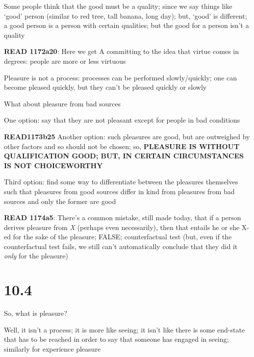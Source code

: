\documentclass[11pt]{article}
\begin{document}
\noindent Some people think that the good must be a quality; since we say things like `good' person (similar to red tree, tall banana, long day); but, `good' is different; a good person is a person with certain qualities; but the good for a person isn't a quality
\vspace*{2mm}

\noindent \textbf{READ 1172a20}: Here we get A committing to the idea that virtue comes in degrees: people are more or less virtuous
\vspace*{2mm}

\noindent Pleasure is not a process: processes can be performed slowly/quickly; one can become pleased quickly, but they can't be pleased quickly or slowly
\vspace*{2mm}

\noindent What about pleasure from bad sources
\vspace*{2mm}

\noindent One option: say that they are not pleasant except for people in bad conditions
\vspace*{2mm}

\noindent \textbf{READ1173b25} Another option: such pleasures are good, but are outweighed by other factors and so should not be chosen; so, \textbf{PLEASURE IS WITHOUT QUALIFICATION GOOD; BUT, IN CERTAIN CIRCUMSTANCES IS NOT CHOICEWORTHY}
\vspace*{2mm}

\noindent Third option: find some way to differentiate between the pleasures themselves such that pleasures from good sources differ in kind from pleasures from bad sources and only the former are good
\vspace*{2mm}

\noindent \textbf{READ 1174a5}: There's a common mistake, still made today, that if a person derives pleasure from \emph{X} (perhaps even necessarily), then that entails he or she X-ed for the sake of the pleasure; FALSE; counterfactual test (but, even if the counterfactual test fails, we still can't automatically conclude that they did it \emph{only} for the pleasure)

\section{10.4}

\noindent So, what is pleasure?
\vspace*{2mm}

\noindent Well, it isn't a process; it is more like seeing; it isn't like there is some end-state that has to be reached in order to say that someone has engaged in seeing; similarly for experience pleasure
\vspace*{2mm}
\end{document}
